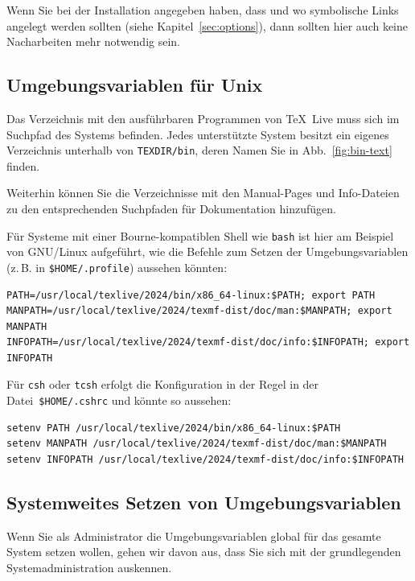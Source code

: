 \documentclass[12pt,ngerman,a4paper,fullparskip]{report}
\newcommand{\TL}{\TeX\ Live\xspace}
\newcommand{\prog}[1]{\texttt{#1}}
\newcommand{\filename}[1]{\texttt{#1}}
\newcommand{\dirname}[1]{\texttt{#1}}
\begin{document}
Wenn Sie bei der Installation angegeben haben, dass und wo symbolische Links angelegt werden sollten (siehe Kapitel~\ref{sec:options}), dann sollten hier auch keine Nacharbeiten mehr notwendig sein.

\subsection{Umgebungsvariablen für Unix}
\label{sec:env}

Das Verzeichnis mit den ausführbaren Programmen von \TL muss sich im Suchpfad des Systems befinden.
Jedes unterstützte System besitzt ein eigenes Verzeichnis unterhalb von \dirname{TEXDIR/bin}, deren
Namen Sie in Abb.~\ref{fig:bin-text} finden.

Weiterhin können Sie die Verzeichnisse mit den Manual-Pages und Info-Dateien zu den entsprechenden
Suchpfaden für Dokumentation hinzufügen.

Für Systeme mit einer Bourne-kompatiblen Shell wie \prog{bash} ist hier am Beispiel von GNU/Linux
aufgeführt, wie die Befehle zum Setzen der Umgebungsvariablen (z.\,B. in \filename{\$HOME/.profile})
aussehen könnten:

\begin{verbatim}
PATH=/usr/local/texlive/2024/bin/x86_64-linux:$PATH; export PATH
MANPATH=/usr/local/texlive/2024/texmf-dist/doc/man:$MANPATH; export MANPATH
INFOPATH=/usr/local/texlive/2024/texmf-dist/doc/info:$INFOPATH; export INFOPATH
\end{verbatim}


\noindent Für \prog{csh} oder \prog{tcsh} erfolgt die Konfiguration in der Regel in der Datei~\filename{\$HOME/.cshrc} und könnte so aussehen:

\begin{verbatim}
setenv PATH /usr/local/texlive/2024/bin/x86_64-linux:$PATH
setenv MANPATH /usr/local/texlive/2024/texmf-dist/doc/man:$MANPATH
setenv INFOPATH /usr/local/texlive/2024/texmf-dist/doc/info:$INFOPATH
\end{verbatim}

\subsection{Systemweites Setzen von Umgebungsvariablen}
\label{sec:envglobal}


Wenn Sie als Administrator die Umgebungsvariablen global für das gesamte System setzen wollen, gehen wir davon aus, dass Sie sich mit der grundlegenden Systemadministration auskennen.
\end{document}

